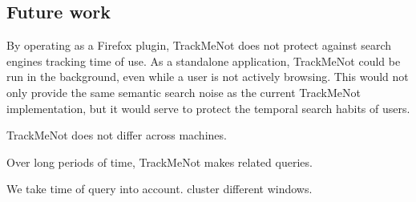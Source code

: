 \documentclass[11pt]{article}
\begin{document}
\begin{multicols}{2}
\section{Future work}
\label{sec:future}
By operating as a Firefox plugin, TrackMeNot does not protect against search engines tracking time of use. As a standalone application, TrackMeNot could be run in the background, even while a user is not actively browsing. This would not only provide the same semantic search noise as the current TrackMeNot implementation, but it would serve to protect the temporal search habits of users.

TrackMeNot does not differ across machines.

Over long periods of time, TrackMeNot makes related queries. 

We take time of query into account. cluster different windows.





\end{multicols}
\newpage
\end{document}
